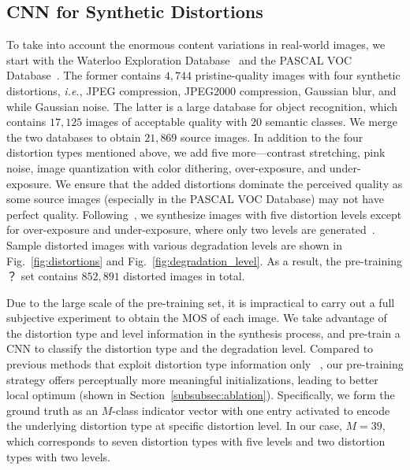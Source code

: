 \documentclass[journal]{IEEEtran}
\begin{document}
\subsection{CNN for Synthetic Distortions}\label{subsec:scnn}
To take into account the enormous content variations in real-world images, we start with the Waterloo Exploration Database~\cite{ma2017waterloo} and the PASCAL VOC Database~\cite{everingham2010pascal}. The former contains $4,744$ pristine-quality images with four synthetic distortions, \textit{i.e.}, JPEG compression, JPEG2000 compression, Gaussian blur, and while Gaussian noise. The latter is a large database for object recognition, which contains $17,125$ images of acceptable quality with $20$ semantic classes. We merge the two databases to obtain $21,869$ source images. In addition to the four distortion types mentioned above, we add five more---contrast stretching, pink noise, image quantization with color dithering, over-exposure, and under-exposure. We ensure that the added distortions dominate the perceived quality as some source images (especially in the PASCAL VOC Database) may not have perfect quality. Following~\cite{ma2017waterloo}, we synthesize images with five distortion levels except for over-exposure and under-exposure, where only two levels are generated~\cite{Ma2015Perceptual}. Sample distorted images with various degradation levels are shown in Fig.~\ref{fig:distortions} and Fig.~\ref{fig:degradation_level}. As a result, the pre-training ？ set contains $852,891$ distorted images in total.












Due to the large scale of the pre-training set, it is impractical to carry out a full subjective experiment to obtain the MOS of each image. We take advantage of the distortion type and level information in the synthesis process, and pre-train a CNN to classify the distortion type and the degradation level. Compared to previous methods that  exploit distortion type information only~\cite{Ma2018End,Kang2015Simultaneous} , our pre-training strategy offers perceptually more meaningful initializations, leading to better local optimum (shown in Section~\ref{subsubsec:ablation}). Specifically, we form the ground truth as an $M$-class indicator vector with one entry activated to encode the underlying distortion type at specific distortion level. In our case, $M = 39$,  which corresponds to seven distortion types with five levels and two distortion types with two levels.
\end{document}
